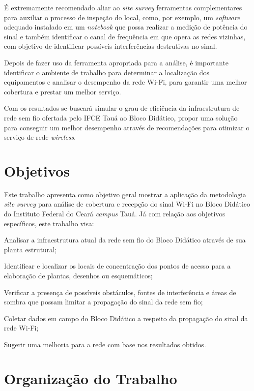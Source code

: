 É extremamente recomendado aliar ao \textit{site survey} ferramentas complementares para auxiliar o processo de inspeção do local, como, por exemplo, um \textit{software} adequado instalado em um \textit{notebook} que possa realizar a medição de potência do sinal e também identificar o canal de frequência em que opera as redes vizinhas, com objetivo de identificar possíveis interferências destrutivas no sinal.

Depois de fazer uso da ferramenta apropriada para a análise, é importante identificar o ambiente de trabalho para determinar a localização dos equipamentos e analisar o desempenho da rede Wi-Fi, para garantir uma melhor cobertura e prestar um melhor serviço.

Com os resultados se buscará simular o grau de eficiência da infraestrutura de rede sem fio ofertada pelo IFCE Tauá ao Bloco Didático, propor uma solução para conseguir um melhor desempenho através de recomendações para otimizar o serviço de rede \textit{wireless}.

\section{Objetivos}
\label{sec:objetivos}

Este trabalho apresenta como objetivo geral mostrar a aplicação da metodologia \textit{site survey} para análise de cobertura e recepção do sinal Wi-Fi no Bloco Didático do Instituto Federal do Ceará \textit{campus} Tauá.
Já com relação aos objetivos específicos, este trabalho visa:
\begin{compactitem}
	\item Analisar a infraestrutura atual da rede sem fio do Bloco Didático através de sua planta estrutural;
	\item Identificar e localizar os locais de concentração dos pontos de acesso para a elaboração de plantas, desenhos ou esquemáticos;
	\item Verificar a presença de possíveis obstáculos, fontes de interferência e áreas de sombra que possam limitar a propagação do sinal da rede sem fio;
	\item Coletar dados em campo do Bloco Didático a respeito da propagação do sinal da rede Wi-Fi;
	\item Sugerir uma melhoria para a rede com base nos resultados obtidos.
\end{compactitem}

\section{Organização do Trabalho}
\label{sec:organnizacao-do-trabalho}

